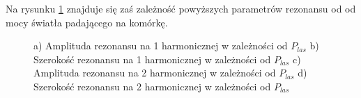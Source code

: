 \documentclass[a4paper,10pt,twoside]{report}
\begin{document}
Na rysunku \ref{wykresikiodP} znajduje się zaś zależność powyższych parametrów rezonansu od od mocy światła padającego na komórkę.


\begin{figure}[h!]
\centering
{}

\caption{ a) Amplituda rezonansu na 1 harmonicznej w zależności od $P_{las}$ b) Szerokość rezonansu na 1 harmonicznej w zależności od $P_{las}$ 
c) Amplituda rezonansu na 2 harmonicznej w zależności od $P_{las}$ d) Szerokość rezonansu na 2 harmonicznej w zależności od $P_{las}$}
\label{wykresikiodP}
\end{figure}
\end{document}
